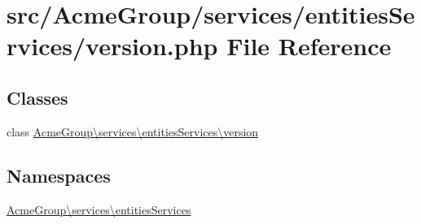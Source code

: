 \hypertarget{services_2entities_services_2version_8php}{\section{src/\+Acme\+Group/services/entities\+Services/version.php File Reference}
\label{services_2entities_services_2version_8php}
}
\subsection*{Classes}
\begin{DoxyCompactItemize}
\item 
class \hyperlink{class_acme_group_1_1services_1_1entities_services_1_1version}{Acme\+Group\textbackslash{}services\textbackslash{}entities\+Services\textbackslash{}version}
\end{DoxyCompactItemize}
\subsection*{Namespaces}
\begin{DoxyCompactItemize}
\item 
 \hyperlink{namespace_acme_group_1_1services_1_1entities_services}{Acme\+Group\textbackslash{}services\textbackslash{}entities\+Services}
\end{DoxyCompactItemize}
